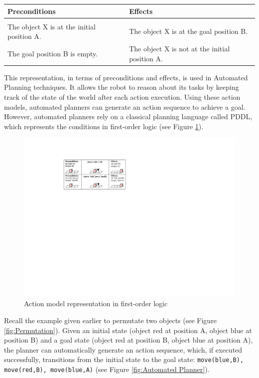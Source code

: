 \begin{table}[h]
\begin{center}
\begin{tabular}{l|l}
Preconditions & Effects\\ \hline
 & \\
The object X is at the initial position A.
& The object X is at the goal position B.\\
The goal position B is empty.
& The object X is not at the initial position A.
\end{tabular}
\end{center}
\label{tab:conditions}
\end{table}

\noindent This representation, in terms of preconditions and effects, is used in Automated Planning techniques.
It allows the robot to reason about its tasks by keeping track of the state of the world after each action execution.
Using these action models, automated planners can generate an action sequence to achieve a goal.
However, automated planners rely on a classical planning language called PDDL, which represents the conditions in first-order logic (see Figure \ref{fig:Pick-up action model}).


  \begin{figure}[h]
    \centering
    \includegraphics[scale=0.4]{figures/schema-logic}
    \caption{Action model representation in first-order logic}
    \label{fig:Pick-up action model}
  \end{figure}
Recall the example given earlier to permutate two objects (see Figure \ref{fig:Permutation}).
Given an initial state (object red at position A, object blue at position B) and a goal state (object red at position B, object blue at position A), the planner can automatically generate an action sequence, which, if executed successfully, transitions from the initial state to the goal state: \texttt{move(blue,B), move(red,B), move(blue,A)} (see Figure \ref{fig:Automated Planner}).


